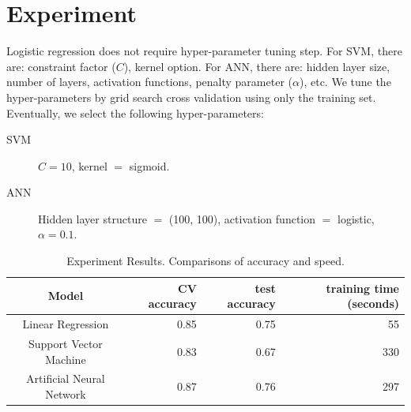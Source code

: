 \documentclass{article}
\begin{document}
%
%


\section{Experiment}

Logistic regression does not require hyper-parameter tuning step. For SVM, there are: constraint factor ($C$), kernel option. For ANN, there are: hidden layer size, number of layers, activation functions, penalty parameter ($\alpha$), etc. We tune the hyper-parameters by grid search cross validation using only the training set. Eventually, we select the following hyper-parameters:
\begin{description}
\item[SVM] $C=10$, kernel $=$ sigmoid.
\item[ANN] Hidden layer structure $=$ (100, 100), activation function $=$ logistic, $\alpha = 0.1$.  
\end{description}

\newpage

\begin{table}[h]
    \centering
    \begin{tabular}{c|rrr}
    \hline
      Model   & CV accuracy & test accuracy & training time (seconds) \\
    \hline
     Linear Regression & 0.85 & 0.75  & 55\\
     Support Vector Machine & 0.83 & 0.67 & 330 \\
     Artificial Neural Network &  0.87  & 0.76  & 297\\
     \hline
    \end{tabular}
    \caption{Experiment Results. Comparisons of accuracy and speed.}
    \label{tab}
\end{table}
\end{document}
